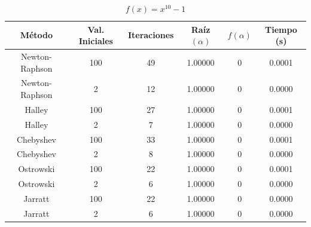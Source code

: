 \begin{table}[H]
\centering

\renewcommand{\arraystretch}{1.3} %
\setlength{\tabcolsep}{12pt}      %

\begin{tabular}{cccccc}
\hline
Método & Val. Iniciales & Iteraciones & Raíz $(\alpha)$ & $f(\alpha)$ & Tiempo (s) \\
\hline

Newton-Raphson & 100 & 49 & 1.00000 & 0                    & 0.0001 \\

Newton-Raphson & 2   & 12 & 1.00000 & 0                    & 0.0000 \\

Halley         & 100 & 27 & 1.00000 & 0                    & 0.0001 \\

Halley         & 2   &  7 & 1.00000 & 0                    & 0.0000 \\

Chebyshev      & 100 & 33 & 1.00000 & 0                    & 0.0001 \\

Chebyshev      & 2   &  8 & 1.00000 & 0                    & 0.0000 \\

Ostrowski      & 100 & 22 & 1.00000 & 0                    & 0.0001 \\

Ostrowski      & 2   &  6 & 1.00000 & 0                    & 0.0000 \\

Jarratt        & 100 & 22 & 1.00000 & 0                    & 0.0000 \\

Jarratt        & 2   &  6 & 1.00000 & 0                    & 0.0000 \\

\hline
\end{tabular}

\caption{$f(x) = x^{10} - 1$}
\end{table}


